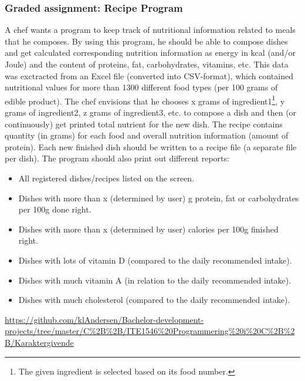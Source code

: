 \subsubsection{Graded assignment: Recipe Program}
\label{sec:recipe_program}
A chef wants a program to keep track of nutritional information related to meals that he composes. 
By using this program, he should be able to compose dishes and get calculated corresponding nutrition information as energy in kcal (and/or Joule) and the content of proteins,
fat, carbohydrates, vitamins, etc.
This data was exctracted from an Excel file (converted into CSV-format), which contained nutritional values for more than 1300 different food types (per 100 grams of edible product). 
\vspace{0.5em}\newline
The chef envisions that he chooses x grams of ingredient1\footnote{
	The given ingredient is selected based on its food number.
}, y grams of ingredient2, z grams of ingredient3, etc. to compose a dish and then (or continuously) get printed total nutrient for the new dish.  
The recipe contains quantity (in grams) for each food and overall nutrition information (amount of protein). 
Each new finished dish should be written to a recipe file (a separate file per dish).
\vspace{0.5em}\newline
The program should also print out different reports:
\begin{itemize}
	\item All registered dishes/recipes listed on the screen.
	\item Dishes with more than x (determined by user) g protein, fat or carbohydrates per 100g done right.
	\item Dishes with more than x (determined by user) calories per 100g finished right.
	\item Dishes with lots of vitamin D (compared to the daily recommended intake).
	\item Dishes with much vitamin A (in relation to the daily recommended intake).
	\item Dishes with much cholesterol (compared to the daily recommended intake).
\end{itemize}
 \url{https://github.com/klAndersen/Bachelor-development-projects/tree/master/C%2B%2B/ITE1546%20Programmering%20i%20C%2B%2B/Karaktergivende}

